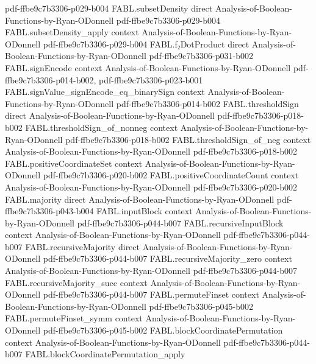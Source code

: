 \begin{theorem}
  {pdf-ffbe9c7b3306-p029-b004}
\proofstep
  {FABL.subsetDensity}
  {direct}
  {Analysis-of-Boolean-Functions-by-Ryan-ODonnell}
  {pdf-ffbe9c7b3306-p029-b004}
\proofstep
  {FABL.subsetDensity_apply}
  {context}
  {Analysis-of-Boolean-Functions-by-Ryan-ODonnell}
  {pdf-ffbe9c7b3306-p029-b004}
\proofstep
  {FABL.f₂DotProduct}
  {direct}
  {Analysis-of-Boolean-Functions-by-Ryan-ODonnell}
  {pdf-ffbe9c7b3306-p031-b002}
\proofstep
  {FABL.signEncode}
  {context}
  {Analysis-of-Boolean-Functions-by-Ryan-ODonnell}
  {pdf-ffbe9c7b3306-p014-b002,
    pdf-ffbe9c7b3306-p023-b001}
\proofstep
  {FABL.signValue_signEncode_eq_binarySign}
  {context}
  {Analysis-of-Boolean-Functions-by-Ryan-ODonnell}
  {pdf-ffbe9c7b3306-p014-b002}
\proofstep
  {FABL.thresholdSign}
  {direct}
  {Analysis-of-Boolean-Functions-by-Ryan-ODonnell}
  {pdf-ffbe9c7b3306-p018-b002}
\proofstep
  {FABL.thresholdSign_of_nonneg}
  {context}
  {Analysis-of-Boolean-Functions-by-Ryan-ODonnell}
  {pdf-ffbe9c7b3306-p018-b002}
\proofstep
  {FABL.thresholdSign_of_neg}
  {context}
  {Analysis-of-Boolean-Functions-by-Ryan-ODonnell}
  {pdf-ffbe9c7b3306-p018-b002}
\proofstep
  {FABL.positiveCoordinateSet}
  {context}
  {Analysis-of-Boolean-Functions-by-Ryan-ODonnell}
  {pdf-ffbe9c7b3306-p020-b002}
\proofstep
  {FABL.positiveCoordinateCount}
  {context}
  {Analysis-of-Boolean-Functions-by-Ryan-ODonnell}
  {pdf-ffbe9c7b3306-p020-b002}
\proofstep
  {FABL.majority}
  {direct}
  {Analysis-of-Boolean-Functions-by-Ryan-ODonnell}
  {pdf-ffbe9c7b3306-p043-b004}
\proofstep
  {FABL.inputBlock}
  {context}
  {Analysis-of-Boolean-Functions-by-Ryan-ODonnell}
  {pdf-ffbe9c7b3306-p044-b007}
\proofstep
  {FABL.recursiveInputBlock}
  {context}
  {Analysis-of-Boolean-Functions-by-Ryan-ODonnell}
  {pdf-ffbe9c7b3306-p044-b007}
\proofstep
  {FABL.recursiveMajority}
  {direct}
  {Analysis-of-Boolean-Functions-by-Ryan-ODonnell}
  {pdf-ffbe9c7b3306-p044-b007}
\proofstep
  {FABL.recursiveMajority_zero}
  {context}
  {Analysis-of-Boolean-Functions-by-Ryan-ODonnell}
  {pdf-ffbe9c7b3306-p044-b007}
\proofstep
  {FABL.recursiveMajority_succ}
  {context}
  {Analysis-of-Boolean-Functions-by-Ryan-ODonnell}
  {pdf-ffbe9c7b3306-p044-b007}
\proofstep
  {FABL.permuteFinset}
  {context}
  {Analysis-of-Boolean-Functions-by-Ryan-ODonnell}
  {pdf-ffbe9c7b3306-p045-b002}
\proofstep
  {FABL.permuteFinset_symm}
  {context}
  {Analysis-of-Boolean-Functions-by-Ryan-ODonnell}
  {pdf-ffbe9c7b3306-p045-b002}
\proofstep
  {FABL.blockCoordinatePermutation}
  {context}
  {Analysis-of-Boolean-Functions-by-Ryan-ODonnell}
  {pdf-ffbe9c7b3306-p044-b007}
\proofstep
  {FABL.blockCoordinatePermutation_apply}

\end{theorem}
